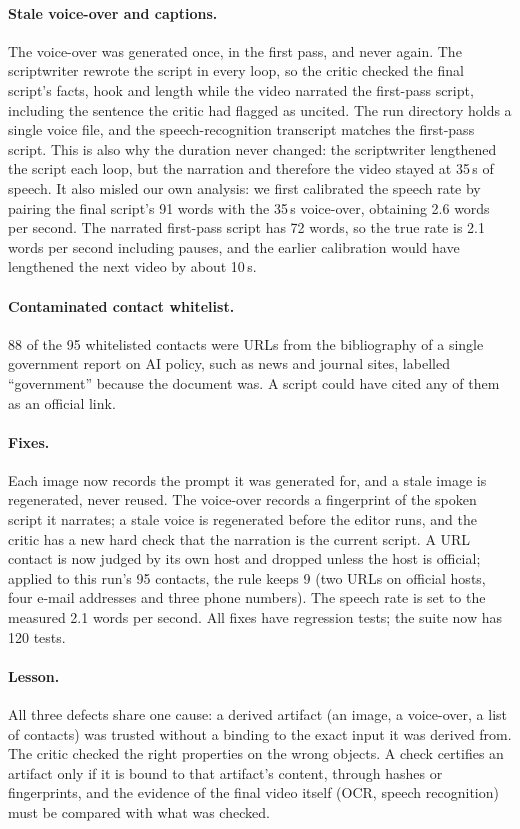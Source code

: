 \documentclass[twoside,11pt]{article}
\begin{document}
\paragraph{Stale voice-over and captions.} The voice-over was generated once, in the first pass, and never again. The scriptwriter rewrote the script in every loop, so the critic checked the final script's facts, hook and length while the video narrated the first-pass script, including the sentence the critic had flagged as uncited. The run directory holds a single voice file, and the speech-recognition transcript matches the first-pass script. This is also why the duration never changed: the scriptwriter lengthened the script each loop, but the narration and therefore the video stayed at 35\,s of speech. It also misled our own analysis: we first calibrated the speech rate by pairing the final script's 91 words with the 35\,s voice-over, obtaining 2.6 words per second. The narrated first-pass script has 72 words, so the true rate is 2.1 words per second including pauses, and the earlier calibration would have lengthened the next video by about 10\,s.

\paragraph{Contaminated contact whitelist.} 88 of the 95 whitelisted contacts were URLs from the bibliography of a single government report on AI policy, such as news and journal sites, labelled ``government'' because the document was. A script could have cited any of them as an official link.

\paragraph{Fixes.} Each image now records the prompt it was generated for, and a stale image is regenerated, never reused. The voice-over records a fingerprint of the spoken script it narrates; a stale voice is regenerated before the editor runs, and the critic has a new hard check that the narration is the current script. A URL contact is now judged by its own host and dropped unless the host is official; applied to this run's 95 contacts, the rule keeps 9 (two URLs on official hosts, four e-mail addresses and three phone numbers). The speech rate is set to the measured 2.1 words per second. All fixes have regression tests; the suite now has 120 tests.

\paragraph{Lesson.} All three defects share one cause: a derived artifact (an image, a voice-over, a list of contacts) was trusted without a binding to the exact input it was derived from. The critic checked the right properties on the wrong objects. A check certifies an artifact only if it is bound to that artifact's content, through hashes or fingerprints, and the evidence of the final video itself (OCR, speech recognition) must be compared with what was checked.
\end{document}
